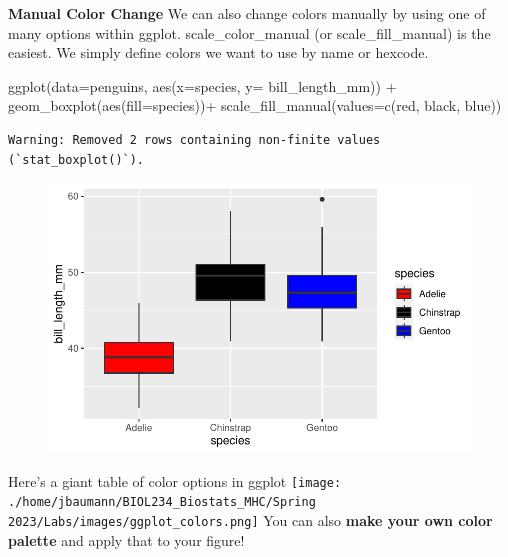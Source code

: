 \documentclass[
  letterpaper,
  DIV=11,
  numbers=noendperiod]{scrartcl}
\newenvironment{Shaded}{\begin{snugshade}}{\end{snugshade}}
\newcommand{\AttributeTok}[1]{\textcolor[rgb]{0.40,0.45,0.13}{#1}}
\newcommand{\FunctionTok}[1]{\textcolor[rgb]{0.28,0.35,0.67}{#1}}
\newcommand{\NormalTok}[1]{\textcolor[rgb]{0.00,0.23,0.31}{#1}}
\newcommand{\SpecialCharTok}[1]{\textcolor[rgb]{0.37,0.37,0.37}{#1}}
\newcommand{\StringTok}[1]{\textcolor[rgb]{0.13,0.47,0.30}{#1}}
\begin{document}
\textbf{Manual Color Change} We can also change colors manually by using
one of many options within ggplot. scale\_color\_manual (or
scale\_fill\_manual) is the easiest. We simply define colors we want to
use by name or hexcode.

\begin{Shaded}
\begin{Highlighting}[]
\FunctionTok{ggplot}\NormalTok{(}\AttributeTok{data=}\NormalTok{penguins, }\FunctionTok{aes}\NormalTok{(}\AttributeTok{x=}\NormalTok{species, }\AttributeTok{y=}\NormalTok{ bill\_length\_mm)) }\SpecialCharTok{+}
  \FunctionTok{geom\_boxplot}\NormalTok{(}\FunctionTok{aes}\NormalTok{(}\AttributeTok{fill=}\NormalTok{species))}\SpecialCharTok{+}
  \FunctionTok{scale\_fill\_manual}\NormalTok{(}\AttributeTok{values=}\FunctionTok{c}\NormalTok{(}\StringTok{\textquotesingle{}red\textquotesingle{}}\NormalTok{, }\StringTok{\textquotesingle{}black\textquotesingle{}}\NormalTok{, }\StringTok{\textquotesingle{}blue\textquotesingle{}}\NormalTok{))}
\end{Highlighting}
\end{Shaded}

\begin{verbatim}
Warning: Removed 2 rows containing non-finite values (`stat_boxplot()`).
\end{verbatim}

\begin{figure}[H]

{\centering \includegraphics{colors_files/figure-pdf/unnamed-chunk-4-1.pdf}

}

\end{figure}

Here's a giant table of color options in ggplot
\texttt{[image: ./home/jbaumann/BIOL234\_Biostats\_MHC/Spring 2023/Labs/images/ggplot\_colors.png]}
You can also \textbf{make your own color palette} and apply that to your
figure!
\end{document}
